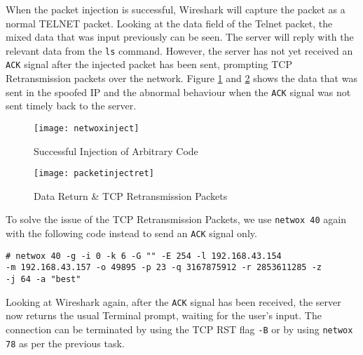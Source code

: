 \documentclass[a4paper,12pt]{article}
\begin{document}
\vspace{1em}
\begin{par}
\noindent When the packet injection is successful, Wireshark will capture the packet as a normal TELNET packet. Looking at the data field of the Telnet packet, the mixed data that was input previously can be seen. The server will reply with the relevant data from the \texttt{ls} command. However, the server has not yet received an \texttt{ACK} signal after the injected packet has been sent, prompting TCP Retransmission packets over the network. Figure \ref{fig:netwoxinject} and \ref{fig:packetinjectret} shows the data that was sent in the spoofed IP and the abnormal behaviour when the \texttt{ACK} signal was not sent timely back to the server.\end{par}
\begin{figure}[H]
	\centering
	\texttt{[image: netwoxinject]}
	\caption{Successful Injection of Arbitrary Code}
	\label{fig:netwoxinject}
\end{figure}

\begin{figure}[H]
	\centering
	\texttt{[image: packetinjectret]}
	\caption{Data Return \& TCP Retransmission Packets}
	\label{fig:packetinjectret}
\end{figure}
\noindent To solve the issue of the TCP Retransmission Packets, we use \texttt{netwox 40} again with the following code instead to send an \texttt{ACK} signal only.
	\begin{verbatim}
# netwox 40 -g -i 0 -k 6 -G "" -E 254 -l 192.168.43.154 
-m 192.168.43.157 -o 49895 -p 23 -q 3167875912 -r 2853611285 -z 
-j 64 -a "best"
\end{verbatim}
\begin{par}
	\noindent Looking at Wireshark again, after the \texttt{ACK} signal has been received, the server now returns the usual Terminal prompt, waiting for the user's input. The connection can be terminated by using the TCP RST flag \texttt{-B} or by using \texttt{netwox 78} as per the previous task.
	\end{par}
\end{document}
